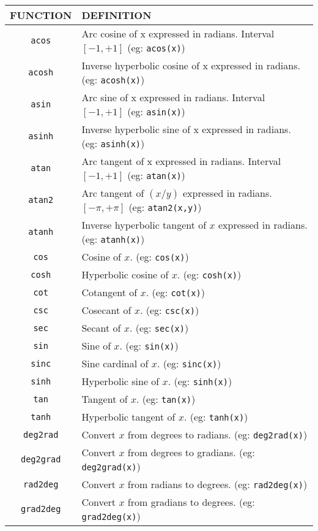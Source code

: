 \begin{tabular}{|c|p{}|}
\hline
FUNCTION & DEFINITION\\
\hline
\verb'acos'& Arc cosine of x expressed in radians. Interval $[-1,+1]$
(eg: \verb'acos(x)')\\
\verb'acosh'& Inverse hyperbolic cosine of x expressed in radians. (eg: \verb'acosh(x)')\\
\verb'asin'& Arc sine of x expressed in radians. Interval $[-1,+1]$ (eg: \verb'asin(x)')\\
\verb'asinh'& Inverse hyperbolic sine of x expressed in radians. (eg:
\verb'asinh(x)')\\
\verb'atan'& Arc tangent of x expressed in radians. Interval $[-1,+1]$
(eg: \verb'atan(x)')\\
\verb'atan2'& Arc tangent of $(x / y)$ expressed in
radians. $[-\pi,+\pi]$ (eg: \verb'atan2(x,y)')\\
\verb'atanh'& Inverse hyperbolic tangent of $x$ expressed in radians. (eg: \verb'atanh(x)')\\
\verb'cos'& Cosine of $x$.  (eg: \verb'cos(x)')\\
\verb'cosh'& Hyperbolic cosine of $x$.  (eg: \verb'cosh(x)')\\
\verb'cot'& Cotangent of $x$.  (eg: \verb'cot(x)')\\
\verb'csc'& Cosecant of $x$.  (eg: \verb'csc(x)')\\ 
\verb'sec'& Secant of $x$.  (eg: \verb'sec(x)')\\
\verb'sin'& Sine of $x$.  (eg: \verb'sin(x)')\\
\verb'sinc'& Sine cardinal of $x$.  (eg: \verb'sinc(x)')\\
\verb'sinh'& Hyperbolic sine of $x$.  (eg: \verb'sinh(x)')\\
\verb'tan'& Tangent of $x$.  (eg: \verb'tan(x)')\\
\verb'tanh'& Hyperbolic tangent of $x$.  (eg: \verb'tanh(x)')\\ 
\verb'deg2rad'& Convert $x$ from degrees to radians.  (eg: \verb'deg2rad(x)')\\
\verb'deg2grad'& Convert $x$ from degrees to gradians.  (eg: \verb'deg2grad(x)')\\
\verb'rad2deg'& Convert $x$ from radians to degrees.  (eg: \verb'rad2deg(x)')\\
\verb'grad2deg'& Convert $x$ from gradians to degrees.  (eg: \verb'grad2deg(x)')\\
\hline
\end{tabular}

